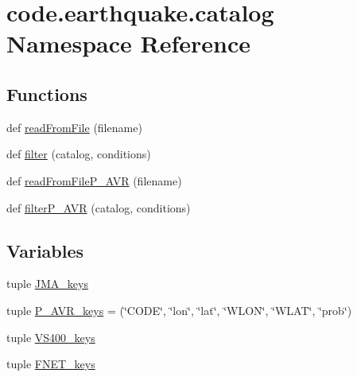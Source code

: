 \hypertarget{namespacecode_1_1earthquake_1_1catalog}{}\section{code.\+earthquake.\+catalog Namespace Reference}
\label{namespacecode_1_1earthquake_1_1catalog}
\subsection*{Functions}
\begin{DoxyCompactItemize}
\item 
def \hyperlink{namespacecode_1_1earthquake_1_1catalog_a73f93e3c5cd169e910d81499d024f15e}{read\+From\+File} (filename)
\item 
def \hyperlink{namespacecode_1_1earthquake_1_1catalog_aa2c0bb457e5d0aa805231889df01e584}{filter} (catalog, conditions)
\item 
def \hyperlink{namespacecode_1_1earthquake_1_1catalog_aa3246dbaba4b4ad94b343d1f47dd62c6}{read\+From\+File\+P\+\_\+\+A\+VR} (filename)
\item 
def \hyperlink{namespacecode_1_1earthquake_1_1catalog_a5f5f312808f59fead17e8a240c6babe5}{filter\+P\+\_\+\+A\+VR} (catalog, conditions)
\end{DoxyCompactItemize}
\subsection*{Variables}
\begin{DoxyCompactItemize}
\item 
tuple \hyperlink{namespacecode_1_1earthquake_1_1catalog_a44170f2ae9a3da309e934ece234c1294}{J\+M\+A\+\_\+keys}
\item 
tuple \hyperlink{namespacecode_1_1earthquake_1_1catalog_ac679c311493ec4df9d1d045a572b10d8}{P\+\_\+\+A\+V\+R\+\_\+keys} = (\char`\"{}C\+O\+DE\char`\"{}, \char`\"{}lon\char`\"{}, \char`\"{}lat\char`\"{}, \char`\"{}W\+L\+ON\char`\"{}, \char`\"{}W\+L\+AT\char`\"{}, \char`\"{}prob\char`\"{})
\item 
tuple \hyperlink{namespacecode_1_1earthquake_1_1catalog_a652468120d0f5522e4cf3c98f6674b31}{V\+S400\+\_\+keys}
\item 
tuple \hyperlink{namespacecode_1_1earthquake_1_1catalog_abc746f43da50a4fa624e73eb53490484}{F\+N\+E\+T\+\_\+keys}
\end{DoxyCompactItemize}


